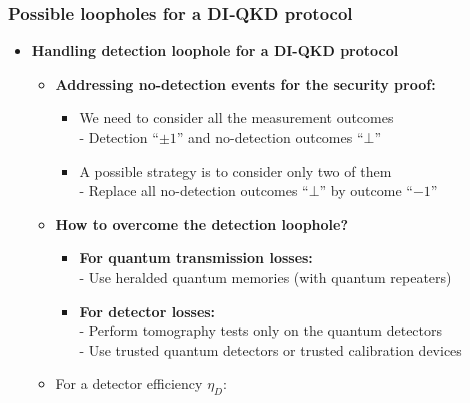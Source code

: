 \documentclass{beamer}
\begin{document}
		\begin{frame}
			\frametitle{\Large Possible loopholes for a DI‑QKD protocol}

            \vspace{3.5ex}
            \begin{itemize}
                \item \textbf{Handling detection loophole for a DI-QKD protocol}
                \begin{itemize}
                    \item \textbf{Addressing no-detection events for the security proof:}
                    \begin{itemize}
                        \small
                        \item We need to consider all the measurement outcomes\\
                        \footnotesize
                        - Detection ``$\pm1$'' and no-detection outcomes ``$\bot$''
                        \small
                        \item A possible strategy is to consider only two of them\\
                        \footnotesize
                        - Replace all no-detection outcomes ``$\bot$'' by outcome ``$-1$''
                    \end{itemize}
                    \vspace{1ex}
                    \item \textbf{How to overcome the detection loophole?}
                    \begin{itemize}
                        \small
                        \item \textbf{For quantum transmission losses:}\\
                        \footnotesize
                        - Use heralded quantum memories (with quantum repeaters)
                        \small
                        \item \textbf{For detector losses:}\\
                        \footnotesize
                        - Perform tomography tests only on the quantum detectors\\
                        - Use trusted quantum detectors or trusted calibration devices
                    \end{itemize}
                    \vspace{1ex}
                    \item For a detector efficiency ${\eta}_{D}$:

\end{itemize}
\end{itemize}
\end{frame}
\end{document}

